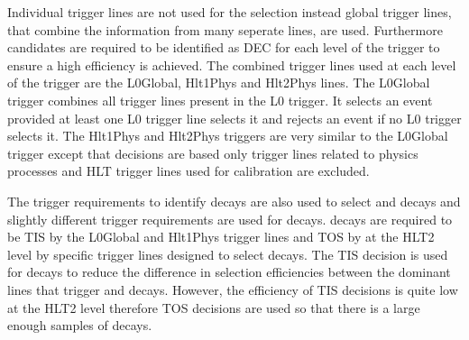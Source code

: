Individual trigger lines are not used for the selection instead global trigger lines, that combine the information from many seperate lines, are used. Furthermore candidates are required to be identified as DEC for each level of the trigger to ensure a high efficiency is achieved. The combined trigger lines used at each level of the trigger are the L0Global, Hlt1Phys and Hlt2Phys lines. 
The L0Global trigger combines all trigger lines present in the L0 trigger. It selects an event provided at least one L0 trigger line selects it and rejects an event if no L0 trigger selects it. The Hlt1Phys and Hlt2Phys triggers are very similar 
to the L0Global trigger except that decisions are based only trigger lines related to physics processes and HLT trigger lines used
 for calibration are excluded.


The trigger requirements to identify \bmumu decays are also used to select \bujpsik and \bsjpsiphi decays and slightly different trigger requirements are used for \bhh decays. \bhh decays are required to be TIS by the L0Global and Hlt1Phys trigger lines and TOS by at the HLT2 level by specific trigger lines designed to select \bhh decays. The TIS decision is used for \bhh decays to reduce the difference in selection efficiencies between the dominant lines that trigger \bhh and \bmumu decays. However, the efficiency of TIS decisions is quite low at the HLT2 level therefore TOS decisions are used so that there is a large enough samples of decays. %


